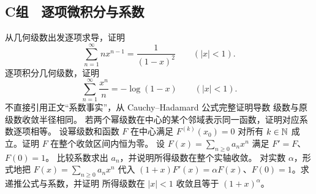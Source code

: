 \subsection*{C组　逐项微积分与系数}
\begin{enumerate}[label=\textbf{\thechapter.\arabic*.},resume]
 从几何级数出发逐项求导，证明
 \[
  \sum_{n=1}^\infty nx^{n-1}=\frac1{(1-x)^2}
  \qquad(|x|<1).
 \]
 逐项积分几何级数，证明
 \[
  \sum_{n=1}^\infty\frac{x^n}{n}=-\log(1-x)
  \qquad(|x|<1).
 \]
 不直接引用正文“系数事实”，从 Cauchy--Hadamard 公式完整证明导数
 级数与原级数收敛半径相同。
 若两个幂级数在中心的某个邻域表示同一函数，证明对应系数逐项相等。
 设幂级数和函数 \(F\) 在中心满足 \(F^{(k)}(x_0)=0\) 对所有
 \(k\in\mathbb{N}\) 成立。证明 \(F\) 在整个收敛区间内恒为零。
 设 \(F(x)=\sum_{n\ge0}a_nx^n\) 满足 \(F'=F\)、\(F(0)=1\)。
 比较系数求出 \(a_n\)，并说明所得级数在整个实轴收敛。
 对实数 \(\alpha\)，形式地把
 \(F(x)=\sum_{n\ge0}a_nx^n\) 代入
 \((1+x)F'(x)=\alpha F(x)\)、\(F(0)=1\)。求递推公式与系数，并证明
 所得级数在 \(|x|<1\) 收敛且等于 \((1+x)^\alpha\)。
\end{enumerate}

